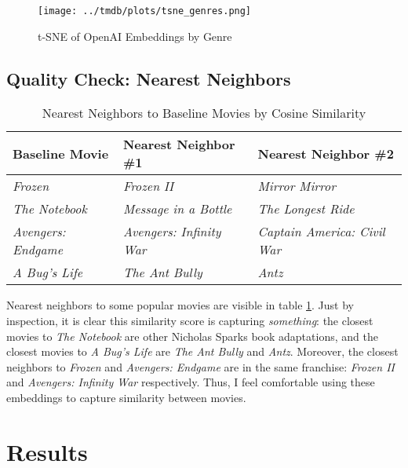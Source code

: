 \documentclass{article}
\begin{document}
\begin{figure}
    \texttt{[image: ../tmdb/plots/tsne\_genres.png]}
    \caption{t-SNE of OpenAI Embeddings by Genre}
    \label{fig:tsne}
\end{figure}


\subsection{Quality Check: Nearest Neighbors}


\begin{table}[]
    \begin{center}
        \begin{tabular}{@{}lll@{}}
        \toprule
        \textbf{Baseline Movie}    & \textbf{Nearest Neighbor \#1}   & \textbf{Nearest Neighbor \#2}       \\ \midrule
        \textit{Frozen}            & \textit{Frozen II}              & \textit{Mirror Mirror}              \\
        \textit{The Notebook}      & \textit{Message in a Bottle}    & \textit{The Longest Ride}           \\
        \textit{Avengers: Endgame} & \textit{Avengers: Infinity War} & \textit{Captain America: Civil War} \\
        \textit{A Bug's Life}      & \textit{The Ant Bully}          & \textit{Antz}                       \\ \bottomrule
        \end{tabular}
        \caption{Nearest Neighbors to Baseline Movies by Cosine Similarity}
        \label{tab:cosine}
    \end{center}
\end{table}

Nearest neighbors to some popular movies are visible in table \ref{tab:cosine}. Just by inspection, it is clear this similarity score is capturing \emph{something}: the closest movies to \emph{The Notebook} are other Nicholas Sparks book adaptations, and the closest movies to \emph{A Bug's Life} are \emph{The Ant Bully} and \emph{Antz}. Moreover, the closest neighbors to \emph{Frozen} and \emph{Avengers: Endgame} are in the same franchise: \emph{Frozen II} and \emph{Avengers: Infinity War} respectively. Thus, I feel comfortable using these embeddings to capture similarity between movies.

\section{Results}
\end{document}
